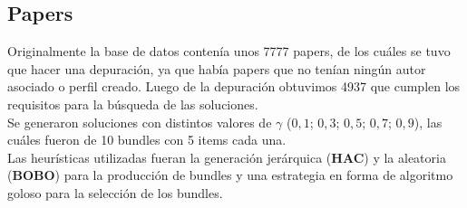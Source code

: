 \subsection{Papers}
Originalmente la base de datos contenía unos 7777 papers, de los cuáles se tuvo que hacer una 
depuración, ya que había papers que no tenían ningún autor asociado o perfil creado. Luego de la 
depuración obtuvimos 4937 que cumplen los requisitos para la búsqueda de las soluciones.\\
Se generaron soluciones con distintos valores de $\gamma$ ($0,1$; $0,3$; $0,5$; $0,7$; $0,9$), las 
cuáles fueron de 10 bundles con 5 items cada una.\\
Las heurísticas utilizadas fueran la generación jerárquica (\textbf{HAC}) y la aleatoria 
(\textbf{BOBO}) para la producción de bundles y una estrategia en forma de algoritmo goloso para la 
selección de los bundles.